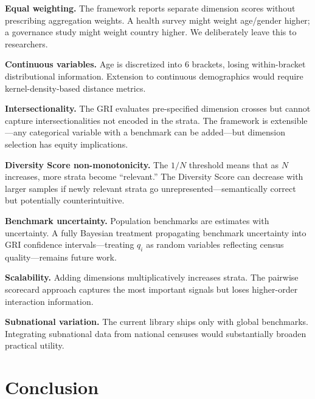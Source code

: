\documentclass[11pt,a4paper]{article}
\begin{document}
\textbf{Equal weighting.} The framework reports separate dimension scores without prescribing aggregation weights. A health survey might weight age/gender higher; a governance study might weight country higher. We deliberately leave this to researchers.

\textbf{Continuous variables.} Age is discretized into 6 brackets, losing within-bracket distributional information. Extension to continuous demographics would require kernel-density-based distance metrics.

\textbf{Intersectionality.} The GRI evaluates pre-specified dimension crosses but cannot capture intersectionalities not encoded in the strata. The framework is extensible---any categorical variable with a benchmark can be added---but dimension selection has equity implications.

\textbf{Diversity Score non-monotonicity.} The $1/N$ threshold means that as $N$ increases, more strata become ``relevant.'' The Diversity Score can decrease with larger samples if newly relevant strata go unrepresented---semantically correct but potentially counterintuitive.

\textbf{Benchmark uncertainty.} Population benchmarks are estimates with uncertainty. A fully Bayesian treatment propagating benchmark uncertainty into GRI confidence intervals---treating $q_i$ as random variables reflecting census quality---remains future work.

\textbf{Scalability.} Adding dimensions multiplicatively increases strata. The pairwise scorecard approach captures the most important signals but loses higher-order interaction information.

\textbf{Subnational variation.} The current library ships only with global benchmarks. Integrating subnational data from national censuses would substantially broaden practical utility.

\section{Conclusion}
\end{document}
